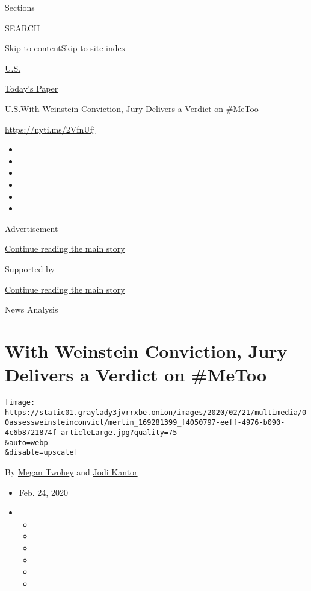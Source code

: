 Sections

SEARCH

\protect\hyperlink{site-content}{Skip to
content}\protect\hyperlink{site-index}{Skip to site index}

\href{https://www.nytimes3xbfgragh.onion/section/us}{U.S.}

\href{https://myaccount.nytimes3xbfgragh.onion/auth/login?response_type=cookie\&client_id=vi}{}

\href{https://www.nytimes3xbfgragh.onion/section/todayspaper}{Today's
Paper}

\href{/section/us}{U.S.}\textbar{}With Weinstein Conviction, Jury
Delivers a Verdict on \#MeToo

\url{https://nyti.ms/2VfnUfj}

\begin{itemize}
\item
\item
\item
\item
\item
\item
\end{itemize}

Advertisement

\protect\hyperlink{after-top}{Continue reading the main story}

Supported by

\protect\hyperlink{after-sponsor}{Continue reading the main story}

News Analysis

\hypertarget{with-weinstein-conviction-jury-delivers-a-verdict-on-metoo}{%
\section{With Weinstein Conviction, Jury Delivers a Verdict on
\#MeToo}\label{with-weinstein-conviction-jury-delivers-a-verdict-on-metoo}}

\texttt{[image: https://static01.graylady3jvrrxbe.onion/images/2020/02/21/multimedia/00assessweinsteinconvict/merlin\_169281399\_f4050797-eeff-4976-b090-4c6b8721874f-articleLarge.jpg?quality=75\\\&auto=webp\\\&disable=upscale]}

By \href{https://www.nytimes3xbfgragh.onion/by/megan-twohey}{Megan
Twohey} and
\href{https://www.nytimes3xbfgragh.onion/by/jodi-kantor}{Jodi Kantor}

\begin{itemize}
\item
  Feb. 24, 2020
\item
  \begin{itemize}
  \item
  \item
  \item
  \item
  \item
  \item
  \end{itemize}
\end{itemize}

